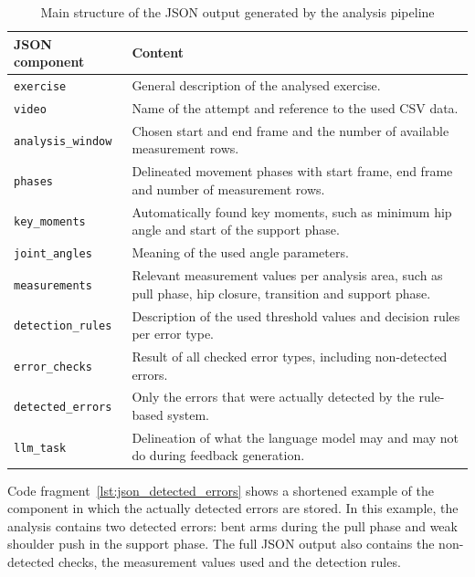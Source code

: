 \begin{table}[H]
    \centering
    \footnotesize
    \begin{tabular}{p{4cm}p{9cm}}
        \toprule
        \textbf{JSON component} & \textbf{Content} \\
        \midrule
        \texttt{exercise} & General description of the analysed exercise. \\
        \texttt{video} & Name of the attempt and reference to the used CSV data. \\
        \texttt{analysis\_window} & Chosen start and end frame and the number of available measurement rows. \\
        \texttt{phases} & Delineated movement phases with start frame, end frame and number of measurement rows. \\
        \texttt{key\_moments} & Automatically found key moments, such as minimum hip angle and start of the support phase. \\
        \texttt{joint\_angles} & Meaning of the used angle parameters. \\
        \texttt{measurements} & Relevant measurement values per analysis area, such as pull phase, hip closure, transition and support phase. \\
        \texttt{detection\_rules} & Description of the used threshold values and decision rules per error type. \\
        \texttt{error\_checks} & Result of all checked error types, including non-detected errors. \\
        \texttt{detected\_errors} & Only the errors that were actually detected by the rule-based system. \\
        \texttt{llm\_task} & Delineation of what the language model may and may not do during feedback generation. \\
        \bottomrule
    \end{tabular}
    \caption{Main structure of the JSON output generated by the analysis pipeline}
    \label{tab:json_structure}
\end{table}

Code fragment~\ref{lst:json_detected_errors} shows a shortened example of the component in which the actually detected errors are stored. In this example, the analysis contains two detected errors: bent arms during the pull phase and weak shoulder push in the support phase. The full JSON output also contains the non-detected checks, the measurement values used and the detection rules.

